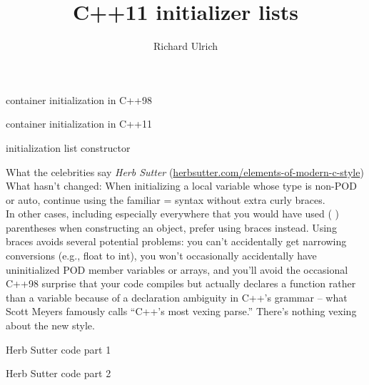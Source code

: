\documentclass[11pt]{beamer}
\author{Richard Ulrich}
\title{C++11 initializer lists}
\institute{cubx Software AG}
\begin{document}
\begin{frame}
\titlepage
\end{frame}


\begin{frame}{container initialization in C++98}

\end{frame}

\begin{frame}{container initialization in C++11}

\end{frame}

\begin{frame}{initialization list constructor}

\end{frame}

\begin{frame}{What the celebrities say}
\emph{Herb Sutter} (\href{http://herbsutter.com/elements-of-modern-c-style}{herbsutter.com/elements-of-modern-c-style})\\

What hasn’t changed: When initializing a local variable whose type is non-POD or auto, continue using the familiar = syntax without extra curly braces.\\
In other cases, including especially everywhere that you would have used ( ) parentheses when constructing an object, prefer using { } braces instead. Using braces avoids several potential problems: you can’t accidentally get narrowing conversions (e.g., float to int), you won’t occasionally accidentally have uninitialized POD member variables or arrays, and you’ll avoid the occasional C++98 surprise that your code compiles but actually declares a function rather than a variable because of a declaration ambiguity in C++’s grammar – what Scott Meyers famously calls “C++’s most vexing parse.” There’s nothing vexing about the new style.
\end{frame}

\begin{frame}{Herb Sutter code part 1}

\end{frame}

\begin{frame}{Herb Sutter code part 2}

\end{frame}
\end{document}
